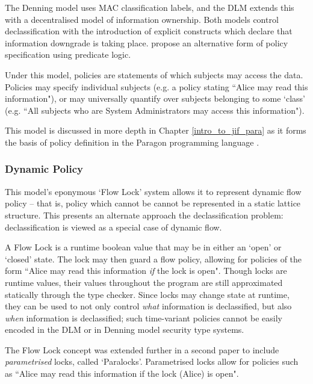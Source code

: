 The Denning model uses MAC classification labels, and the DLM extends this with a decentralised model of information ownership. Both models control declassification with the introduction of explicit constructs which declare that information downgrade is taking place. \citeauthor{broberg2006flow} \cite{broberg2006flow} propose an alternative form of policy specification using predicate logic.

Under this model, policies are statements of which subjects may access the data. Policies may specify individual subjects (e.g. a policy stating ``Alice may read this information"), or may universally quantify over subjects belonging to some `class' (e.g. ``All subjects who are System Administrators may access this information").

This model is discussed in more depth in Chapter \ref{intro_to_jif_para} as it forms the basis of policy definition in the Paragon programming language \cite{broberg2013paragon}.

\subsubsection{Dynamic Policy}

This model's eponymous `Flow Lock' system allows it to represent dynamic flow policy -- that is, policy which cannot be cannot be represented in a static lattice structure. This presents an alternate approach the declassification problem: declassification is viewed as a special case of dynamic flow.

A Flow Lock is a runtime boolean value that may be in either an `open' or `closed' state. The lock may then guard a flow policy, allowing for policies of the form ``Alice may read this information \textit{if} the lock  is open". Though locks are runtime values, their values throughout the program are still approximated statically through the type checker. Since locks may change state at runtime, they can be used to not only control \textit{what} information is declassified, but also \textit{when} information is declassified; such time-variant policies cannot be easily encoded in the DLM or in Denning model security type systems.

The Flow Lock concept was extended further in a second paper \cite{broberg2010paralocks} to include \textit{parametrised} locks, called `Paralocks'. Parametrised locks allow for policies such as ``Alice may read this information if the lock (Alice) is open".

